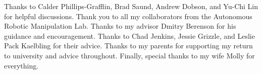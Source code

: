 \noindent
Thanks to Calder Phillips-Grafflin, Brad Saund, Andrew Dobson, and Yu-Chi Lin for helpful discussions. Thank you to all my collaborators from the Autonomous Robotic Manipulation Lab. Thanks to my advisor Dmitry Berenson for his guidance and encouragement. Thanks to Chad Jenkins, Jessie Grizzle, and Leslie Pack Kaelbling for their advice. Thanks to my parents for supporting my return to university and advice throughout. Finally, special thanks to my wife Molly for everything.